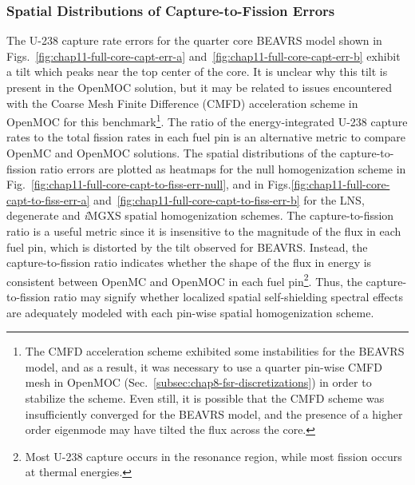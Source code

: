 \clearpage

\subsubsection{Spatial Distributions of Capture-to-Fission Errors}
\label{subsec:chap11-imgxs-capt-to-fiss-errors}

The U-238 capture rate errors for the quarter core \ac{BEAVRS} model shown in Figs.~\ref{fig:chap11-full-core-capt-err-a} and~\ref{fig:chap11-full-core-capt-err-b} exhibit a tilt which peaks near the top center of the core. It is unclear why this tilt is present in the OpenMOC solution, but it may be related to issues encountered with the Coarse Mesh Finite Difference (CMFD) acceleration scheme in OpenMOC for this benchmark\footnote{The \ac{CMFD} acceleration scheme exhibited some instabilities for the \ac{BEAVRS} model, and as a result, it was necessary to use a quarter pin-wise \ac{CMFD} mesh in OpenMOC (Sec.~\ref{subsec:chap8-fsr-discretizations}) in order to stabilize the scheme. Even still, it is possible that the \ac{CMFD} scheme was insufficiently converged for the \ac{BEAVRS} model, and the presence of a higher order eigenmode may have tilted the flux across the core.}. The ratio of the energy-integrated U-238 capture rates to the total fission rates in each fuel pin is an alternative metric to compare OpenMC and OpenMOC solutions. The spatial distributions of the capture-to-fission ratio errors are plotted as heatmaps for the null homogenization scheme in Fig.~\ref{fig:chap11-full-core-capt-to-fiss-err-null}, and in Figs.\ref{fig:chap11-full-core-capt-to-fiss-err-a} and~\ref{fig:chap11-full-core-capt-to-fiss-err-b} for the \ac{LNS}, degenerate and \textit{i}\ac{MGXS} spatial homogenization schemes. The capture-to-fission ratio is a useful metric since it is insensitive to the magnitude of the flux in each fuel pin, which is distorted by the tilt observed for \ac{BEAVRS}. Instead, the capture-to-fission ratio indicates whether the shape of the flux in energy is consistent between OpenMC and OpenMOC in each fuel pin\footnote{Most U-238 capture occurs in the resonance region, while most fission occurs at thermal energies.}. Thus, the capture-to-fission ratio may signify whether localized spatial self-shielding spectral effects are adequately modeled with each pin-wise spatial homogenization scheme.

